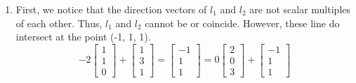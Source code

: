 \begin{SaveQuestion}
    \begin{enumerate}
        \item First, we notice that the direction vectors of $l_1$ and $l_2$ are not scalar multiples of each other. Thus, $l_1$ and $l_2$ cannot be  or coincide. However, these line do intersect at the point (-1, 1, 1).
        $$-2 \begin{bmatrix} 1 \\ 1 \\ 0\end{bmatrix} + \begin{bmatrix} 1 \\ 3 \\ 1 \end{bmatrix} = \begin{bmatrix} -1 \\ 1 \\ 1 \end{bmatrix} = 0\begin{bmatrix} 2 \\ 0 \\ 3 \end{bmatrix} + \begin{bmatrix} -1 \\ 1 \\ 1 \end{bmatrix}$$


\end{enumerate}
\end{SaveQuestion}
